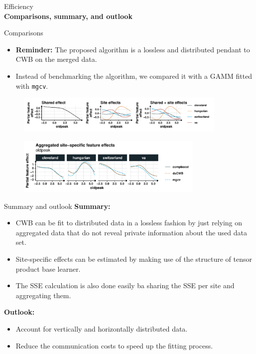 \documentclass[t,10pt]{beamer}
\newcommand{\fSlide}[2]{
\begin{frame}[plain]{}%
  \vspace{4cm}%
  \Large #1\\[0.2cm]%
  {\LARGE\textbf{#2}}%
	\addtocounter{framenumber}{-1}%
\end{frame}%
}
\begin{document}
\fSlide{Efficiency}{Comparisons, summary, and outlook}

\begin{frame}{Comparisons}
  \begin{itemize}
    \item \textbf{Reminder:} The proposed algorithm is a lossless and distributed pendant to CWB on the merged data.
    \item Instead of benchmarking the algorithm, we compared it with a GAMM fitted with \texttt{mgcv}.
  \end{itemize}
  \begin{figure}
    \centering
    \includegraphics[width=0.9\textwidth]{figures/fig-dcwb-effect-decomposition.pdf}
  \end{figure}
  \vspace{-0.2cm}
  \begin{figure}
    \centering
    \includegraphics[width=0.8\textwidth]{figures/fig-dcwb-effect-comparison.pdf}
  \end{figure}
\end{frame}


\begin{frame}{Summary and outlook}
  \textbf{Summary:}
  \begin{itemize}
    \item
      CWB can be fit to distributed data in a lossless fashion by just relying on aggregated data that do not reveal private information about the used data set.
    \item
      Site-specific effects can be estimated by making use of the structure of tensor product base learner.
    \item
      The SSE calculation is also done easily ba sharing the SSE per site and aggregating them.
  \end{itemize}
  \textbf{Outlook:}
  \begin{itemize}
    \item Account for vertically and horizontally distributed data.
    \item Reduce the communication costs to speed up the fitting process.
  \end{itemize}
\end{frame}
\end{document}
